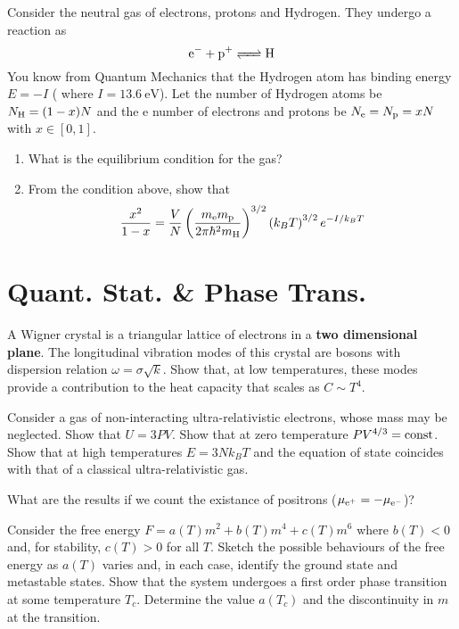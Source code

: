 \documentclass[CJK]{beamer}
\begin{document}
\begin{frame}
\bch
Consider the neutral gas of electrons, protons and Hydrogen. They undergo a reaction as $$ \ce{e- + p+ <=> H}$$ You know from Quantum Mechanics that the Hydrogen atom
has binding energy $E = -I$ ( where $I = 13.6 \mathrm{\ eV}$). Let the number of Hydrogen atoms
be $N_{\rm H} = (1-x) N$ and the e number of electrons and protons be $N_{\rm e} = N_{\rm p} = xN$ with $x\in [0,1]$.
\begin{enumerate}
\item What is the equilibrium condition for the gas?
\item From the condition above, show that $$\frac{x^{2}}{1-x}=\frac{V}{N}\left(\frac{m_{\rm e} m_{\rm p}}{2 \pi \hbar^{2} m_{\rm H}}\right)^{3 / 2}\left(k_{B} T\right)^{3 / 2} e^{-I / k_{B} T}$$
\end{enumerate}
\ech
\end{frame}

\section{Quant. Stat. \& Phase Trans.}
\begin{frame}
\bch
A Wigner crystal is a triangular lattice of electrons in a {\bf two dimensional plane}.
The longitudinal vibration modes of this crystal are bosons with dispersion relation $\omega = \sigma \sqrt{k}$. Show that, at low temperatures, these modes provide a contribution to the
heat capacity that scales as $C \sim T^4$.
\ech
\end{frame}

\begin{frame}
\bch
Consider a gas of non-interacting ultra-relativistic electrons, whose mass may be
neglected. Show that $U = 3PV$. Show that
at zero temperature $PV^{4/3} = {\rm const}$. Show that at high temperatures $ E = 3Nk_B T$ and
the equation of state coincides with that of a classical ultra-relativistic gas.
\par
What are the results if we count the existance of positrons ($\mu_{\rm e^+} = -\mu_{\rm e^-}$)?
\ech
\end{frame}

\begin{frame}
\bch
Consider the free energy $F = a(T)m^2 + b(T)m^4 + c(T)m^6$ where $b(T)<0$ and, for stability, $c(T) > 0$ for all $T$. Sketch the possible behaviours
of the free energy as $a(T)$ varies and, in each case, identify the ground state and
metastable states. Show that the system undergoes a first order phase transition at
some temperature $T_c$. Determine the value $a(T_c)$  and the discontinuity in $m$ at the transition.
\ech
\end{frame}
\end{document}

